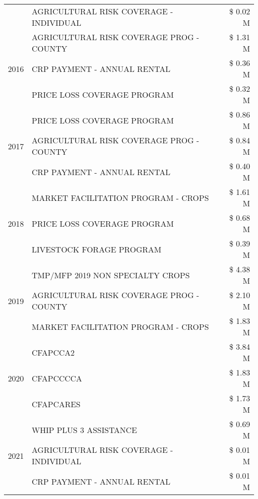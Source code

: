 \begin{tabular}{llr}
 & AGRICULTURAL RISK COVERAGE - INDIVIDUAL & \$ 0.02 M \\
\cline{1-3}
\multirow[t]{3}{*}{2016} & AGRICULTURAL RISK COVERAGE PROG - COUNTY & \$ 1.31 M \\
 & CRP PAYMENT - ANNUAL RENTAL & \$ 0.36 M \\
 & PRICE LOSS COVERAGE PROGRAM & \$ 0.32 M \\
\cline{1-3}
\multirow[t]{3}{*}{2017} & PRICE LOSS COVERAGE PROGRAM & \$ 0.86 M \\
 & AGRICULTURAL RISK COVERAGE PROG - COUNTY & \$ 0.84 M \\
 & CRP PAYMENT - ANNUAL RENTAL & \$ 0.40 M \\
\cline{1-3}
\multirow[t]{3}{*}{2018} & MARKET FACILITATION PROGRAM - CROPS & \$ 1.61 M \\
 & PRICE LOSS COVERAGE PROGRAM & \$ 0.68 M \\
 & LIVESTOCK FORAGE PROGRAM & \$ 0.39 M \\
\cline{1-3}
\multirow[t]{3}{*}{2019} & TMP/MFP 2019 NON SPECIALTY CROPS & \$ 4.38 M \\
 & AGRICULTURAL RISK COVERAGE PROG - COUNTY & \$ 2.10 M \\
 & MARKET FACILITATION PROGRAM - CROPS & \$ 1.83 M \\
\cline{1-3}
\multirow[t]{3}{*}{2020} & CFAPCCA2 & \$ 3.84 M \\
 & CFAPCCCCA & \$ 1.83 M \\
 & CFAPCARES & \$ 1.73 M \\
\cline{1-3}
\multirow[t]{3}{*}{2021} & WHIP PLUS 3 ASSISTANCE & \$ 0.69 M \\
 & AGRICULTURAL RISK COVERAGE - INDIVIDUAL & \$ 0.01 M \\
 & CRP PAYMENT - ANNUAL RENTAL & \$ 0.01 M \\
\cline{1-3}
\bottomrule
\end{tabular}
